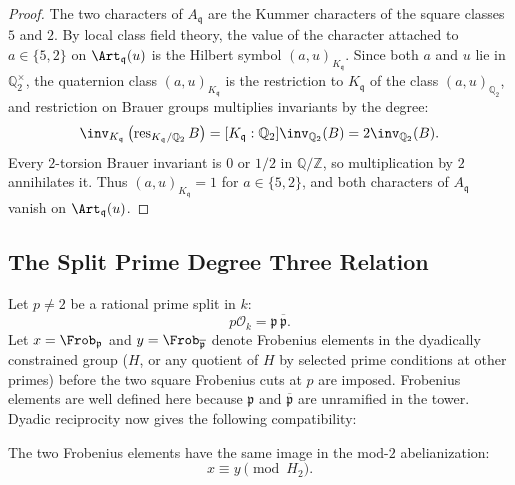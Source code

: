 \begin{proof}
The two characters of $A_{\mathfrak{q}}$ are the Kummer characters of the square classes $5$ and $2$.  By local class field theory, the value of the character attached to $a\in\{5,2\}$ on $\Art_{\mathfrak{q}}(u)$ is the Hilbert symbol $(a,u)_{K_{\mathfrak{q}}}$.  Since both $a$ and $u$ lie in $\mathbb{Q}_2^\times$, the quaternion class $(a,u)_{K_{\mathfrak{q}}}$ is the restriction to $K_{\mathfrak{q}}$ of the class $(a,u)_{\mathbb{Q}_2}$, and restriction on Brauer groups multiplies invariants by the degree:
\[
   \inv_{K_{\mathfrak{q}}}\left(\operatorname{res}_{K_{\mathfrak{q}}/\mathbb{Q}_2}B\right)=[K_{\mathfrak{q}}:\mathbb{Q}_2]\inv_{\mathbb{Q}_2}(B)=2\inv_{\mathbb{Q}_2}(B).
\]
Every $2$-torsion Brauer invariant is $0$ or $1/2$ in $\mathbb{Q}/\mathbb{Z}$, so multiplication by $2$ annihilates it.  Thus $(a,u)_{K_{\mathfrak{q}}}=1$ for $a\in\{5,2\}$, and both characters of $A_{\mathfrak{q}}$ vanish on $\Art_{\mathfrak{q}}(u)$.
\end{proof}

\subsection{The Split Prime Degree Three Relation}

Let $p\ne2$ be a rational prime split in $k$:
\[
   p\mathcal{O}_k=\mathfrak{p}\,\overline{\mathfrak{p}}.
\]
Let $x=\Frob_{\mathfrak{p}}$ and $y=\Frob_{\overline{\mathfrak{p}}}$ denote Frobenius elements in the dyadically constrained group ($H$, or any quotient of $H$ by selected prime conditions at other primes) before the two square Frobenius cuts at $p$ are imposed.  Frobenius elements are well defined here because $\mathfrak{p}$ and $\overline{\mathfrak{p}}$ are unramified in the tower.  Dyadic reciprocity now gives the following compatibility:

\begin{lemma}\label{lem:split-frattini}
The two Frobenius elements have the same image in the mod-$2$ abelianization:
\[
   x\equiv y\pmod {H_2}.
\]
\end{lemma}

